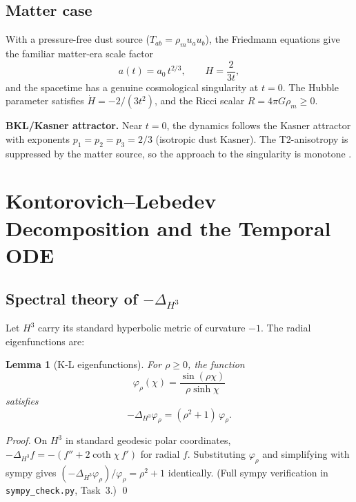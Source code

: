 \documentclass[12pt,letterpaper]{article}
\newtheorem{lemma}[theorem]{Lemma}
\begin{document}
\subsection{Matter case}

With a pressure-free dust source ($T_{ab} = \rho_m u_a u_b$),
the Friedmann equations give the familiar matter-era scale factor
\begin{equation}
  a(t) = a_0\, t^{2/3}, \qquad H = \frac{2}{3t},
  \label{eq:matter}
\end{equation}
and the spacetime has a genuine cosmological singularity at $t=0$.
The Hubble parameter satisfies $\dot{H} = -2/(3t^2)$, and the
Ricci scalar $R = 4\pi G\rho_m \geq 0$.

\textbf{BKL/Kasner attractor.} Near $t=0$, the dynamics follows
the Kasner attractor with exponents $p_1 = p_2 = p_3 = 2/3$
(isotropic dust Kasner). The T2-anisotropy is suppressed by the matter
source, so the approach to the singularity is monotone
\cite{Ringström09,BKL82}.

\section{Kontorovich--Lebedev Decomposition and the Temporal ODE}
\label{sec:KL}

\subsection{Spectral theory of $-\Delta_{H^3}$}

Let $H^3$ carry its standard hyperbolic metric of curvature $-1$.
The radial eigenfunctions are:

\begin{lemma}[K-L eigenfunctions]
\label{lem:eigen}
For $\rho \geq 0$, the function
\begin{equation}
  \varphi_\rho(\chi) = \frac{\sin(\rho\chi)}{\rho\sinh\chi}
  \label{eq:eigenfunction}
\end{equation}
satisfies
\begin{equation}
  -\Delta_{H^3}\varphi_\rho = (\rho^2 + 1)\,\varphi_\rho.
  \label{eq:eigenvalue}
\end{equation}
\end{lemma}
\begin{proof}
On $H^3$ in standard geodesic polar coordinates,
$-\Delta_{H^3} f = -(f'' + 2\coth\chi\, f')$ for radial $f$.
Substituting $\varphi_\rho$ and simplifying with sympy gives
$(-\Delta_{H^3}\varphi_\rho)/\varphi_\rho = \rho^2 + 1$ identically.
(Full sympy verification in \texttt{sympy\_check.py}, Task~3.)
\qed
\end{proof}
\end{document}
